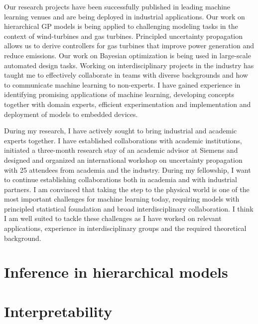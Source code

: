 Our research projects have been successfully published in leading machine learning venues and are being deployed in industrial applications.
Our work on hierarchical GP models is being applied to challenging modeling tasks in the context of wind-turbines and gas turbines.
Principled uncertainty propagation allows us to derive controllers for gas turbines that improve power generation and reduce emissions.
Our work on Bayesian optimization is being used in large-scale automated design tasks.
Working on interdisciplinary projects in the industry has taught me to effectively collaborate in teams with diverse backgrounds and how to communicate machine learning to non-experts.
I have gained experience in identifying promising applications of machine learning, developing concepts together with domain experts, efficient experimentation and implementation and deployment of models to embedded devices.

During my research, I have actively sought to bring industrial and academic experts together.
I have established collaborations with academic institutions, initiated a three-month research stay of an academic advisor at Siemens and designed and organized an international workshop on uncertainty propagation with 25 attendees from academia and the industry.
During my fellowship, I want to continue establishing collaborations both in academia and with industrial partners.
I am convinced that taking the step to the physical world is one of the most important challenges for machine learning today, requiring models with principled statistical foundation and broad interdisciplinary collaboration.
I think I am well suited to tackle these challenges as I have worked on relevant applications, experience in interdisciplinary groups and the required theoretical background.


\section{Inference in hierarchical models}


\section{Interpretability}


